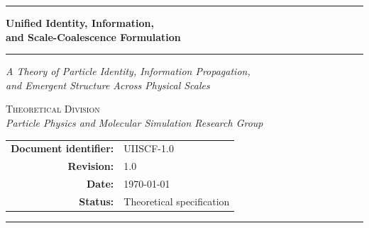 \documentclass[11pt,a4paper]{article}
\begin{document}

\thispagestyle{empty}

\vspace*{3cm}

\begin{center}
  \noindent\rule{\textwidth}{1.2pt}
  \vspace{1.2em}

  {\fontsize{22}{28}\selectfont\bfseries
    Unified Identity, Information,\\[0.3em]
    and Scale-Coalescence Formulation
  }

  \vspace{0.9em}
  \noindent\rule{\textwidth}{0.5pt}
  \vspace{0.9em}

  {\large\itshape
    A Theory of Particle Identity, Information Propagation,\\[0.2em]
    and Emergent Structure Across Physical Scales
  }

  \vspace{2.4em}

  {\normalsize
    \textsc{Theoretical Division}\\[0.5em]
    \textit{Particle Physics and Molecular Simulation Research Group}
  }

  \vspace{2em}

  {\small
    \begin{tabular}{rl}
      \textbf{Document identifier:} & UIISCF-1.0 \\[0.3em]
      \textbf{Revision:}            & 1.0 \\[0.3em]
      \textbf{Date:}                & \today \\[0.3em]
      \textbf{Status:}              & Theoretical specification \\
    \end{tabular}
  }

  \vspace{3cm}

  \noindent\rule{\textwidth}{0.5pt}
  \vspace{0.9em}


\end{center}
\end{document}
